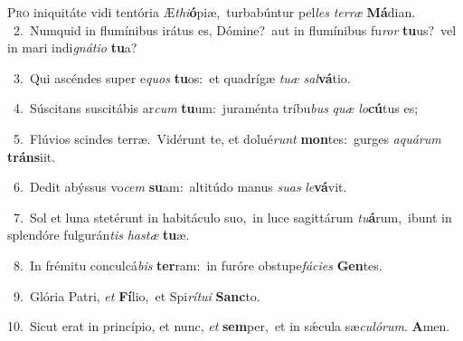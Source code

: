 \lettrine{\initial\textcolor{\initialcolor}{P}}{ro} iniquitáte vidi tentória Æ\-\textit{thi}\-\textbf{ó}piæ,~\star turbabúntur pel\textit{les} \textit{ter}\-\textit{ræ} \textbf{Má}\-dian.\\
{\numbfont\textcolor{\numbcolor}{~2.}}~Numquid in flumínibus irátus es, Dómine?~\dagger aut in flumínibus fu\textit{ror} \textbf{tu}\-us?~\star vel in mari indi\-\textit{gná}\-\textit{ti}\textit{o} \textbf{tu}\-a?\par
{\numbfont\textcolor{\numbcolor}{~3.}}~Qui ascéndes super e\textit{quos} \textbf{tu}\-os:~\star et quadrígæ \textit{tu}\-\textit{æ} \textit{sal}\-\textbf{vá}tio.\par
{\numbfont\textcolor{\numbcolor}{~4.}}~Súscitans suscitábis ar\textit{cum} \textbf{tu}\-um:~\star juraménta tríbu\textit{bus} \textit{quæ} \textit{lo}\-\textbf{cú}tus es;\par
{\numbfont\textcolor{\numbcolor}{~5.}}~Flúvios scindes terræ.~\dagger Vidérunt te, et dolué\textit{runt} \textbf{mon}\-tes:~\star gurges \textit{a}\-\textit{quá}\textit{rum} \textbf{tráns}\-iit.\par
{\numbfont\textcolor{\numbcolor}{~6.}}~Dedit abýssus vo\textit{cem} \textbf{su}\-am:~\star altitúdo manus \textit{su}\-\textit{as} \textit{le}\-\textbf{vá}vit.\par
{\numbfont\textcolor{\numbcolor}{~7.}}~Sol et luna stetérunt in habitáculo suo,~\dagger in luce sagittárum \textit{tu}\-\textbf{á}rum,~\star ibunt in splendóre fulgurán\textit{tis} \textit{has}\-\textit{tæ} \textbf{tu}\-æ.\par
{\numbfont\textcolor{\numbcolor}{~8.}}~In frémitu conculcá\textit{bis} \textbf{ter}\-ram:~\star in furóre obstupe\-\textit{fá}\-\textit{ci}\textit{es} \textbf{Gen}\-tes.\par
{\numbfont\textcolor{\numbcolor}{~9.}}~Glória Patri, \textit{et} \textbf{Fí}\-lio,~\star et Spi\-\textit{rí}\-\textit{tu}\textit{i} \textbf{Sanc}\-to.\par
{\numbfont\textcolor{\numbcolor}{10.}}~Sicut erat in princípio, et nunc, \textit{et} \textbf{sem}\-per,~\star et in sǽcula sæ\-\textit{cu}\-\textit{ló}\textit{rum}. \textbf{A}\-men.\par

